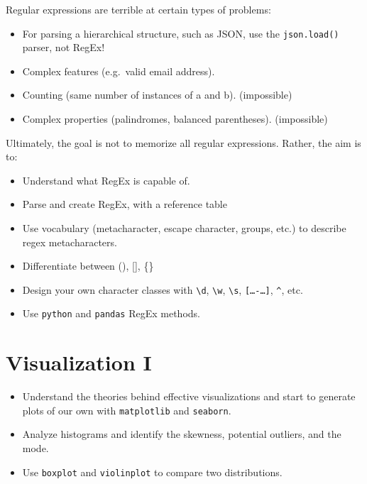 \documentclass[
  letterpaper,
  DIV=11,
  numbers=noendperiod]{scrreprt}
\providecommand{\tightlist}{%
  \setlength{\itemsep}{0pt}\setlength{\parskip}{0pt}}\usepackage{longtable,booktabs,array}
\begin{document}
Regular expressions are terrible at certain types of problems:

\begin{itemize}
\tightlist
\item
  For parsing a hierarchical structure, such as JSON, use the
  \texttt{json.load()} parser, not RegEx!
\item
  Complex features (e.g.~valid email address).
\item
  Counting (same number of instances of a and b). (impossible)
\item
  Complex properties (palindromes, balanced parentheses). (impossible)
\end{itemize}

Ultimately, the goal is not to memorize all regular expressions. Rather,
the aim is to:

\begin{itemize}
\tightlist
\item
  Understand what RegEx is capable of.
\item
  Parse and create RegEx, with a reference table
\item
  Use vocabulary (metacharacter, escape character, groups, etc.) to
  describe regex metacharacters.
\item
  Differentiate between (), {[}{]}, \{\}
\item
  Design your own character classes with \texttt{\textbackslash{}d},
  \texttt{\textbackslash{}w}, \texttt{\textbackslash{}s},
  \texttt{{[}…-…{]}}, \texttt{\^{}}, etc.
\item
  Use \texttt{python} and \texttt{pandas} RegEx methods.
\end{itemize}


\chapter{Visualization I}\label{visualization-i}

\begin{tcolorbox}[enhanced jigsaw, titlerule=0mm, bottomtitle=1mm, arc=.35mm, colframe=quarto-callout-note-color-frame, rightrule=.15mm, opacityback=0, opacitybacktitle=0.6, leftrule=.75mm, breakable, toprule=.15mm, colback=white, left=2mm, colbacktitle=quarto-callout-note-color!10!white, toptitle=1mm, bottomrule=.15mm, title=\textcolor{quarto-callout-note-color}{\faInfo}\hspace{0.5em}{Learning Outcomes}, coltitle=black]

\begin{itemize}
\tightlist
\item
  Understand the theories behind effective visualizations and start to
  generate plots of our own with \texttt{matplotlib} and
  \texttt{seaborn}.
\item
  Analyze histograms and identify the skewness, potential outliers, and
  the mode.
\item
  Use \texttt{boxplot} and \texttt{violinplot} to compare two
  distributions.
\end{itemize}

\end{tcolorbox}
\end{document}
